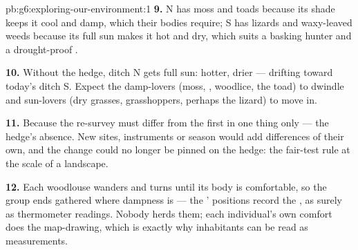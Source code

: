 \begin{solution}{pb:g6:exploring-our-environment:1}
\textbf{9.} N has moss and toads because its shade keeps it
cool and damp, which their bodies require; S has lizards and
waxy-leaved weeds because its full sun makes it hot and dry,
which suits a basking hunter and a drought-proof .

\textbf{10.} Without the hedge, ditch N gets full sun: hotter,
drier ---  drifting toward today's ditch S. Expect
the damp-lovers (moss, , woodlice, the toad) to dwindle
and sun-lovers (dry grasses, grasshoppers, perhaps the
lizard) to move in.

\textbf{11.} Because the re-survey must differ from the first
in one thing only --- the hedge's absence. New sites,
instruments or season would add differences of their own,
and the change could no longer be pinned on the hedge: the
fair-test rule at the scale of a landscape.

\textbf{12.} Each woodlouse wanders and turns until its body
is comfortable, so the group ends gathered where dampness
is --- the ' positions record the , as
surely as thermometer readings. Nobody herds them; each
individual's own comfort does the map-drawing, which is
exactly why inhabitants can be read as measurements.
\end{solution}
